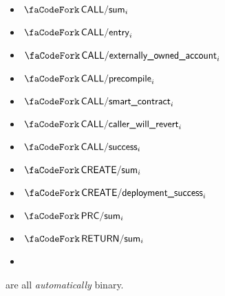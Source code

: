 \begin{multicols}{2}
	\begin{itemize}
		\item $\scenCallSum_{i}$
		\item $\scenCallEntry_{i}$
		\item $\scenCallEoa_{i}$
		\item $\scenCallPrc_{i}$
		\item $\scenCallSmc_{i}$
		\item $\scenCallerWillRevert_{i}$
		\item $\scenCallSuccess_{i}$
		\item $\scenCreateSum_{i}$
		\item $\scenCreateSuccess_{i}$
		\item $\scenPrecompileSum_{i}$
		\item $\scenReturnSum_{i}$
		\item[\vspace{\fill}]
	\end{itemize}
\end{multicols}
are all \emph{automatically} binary.

